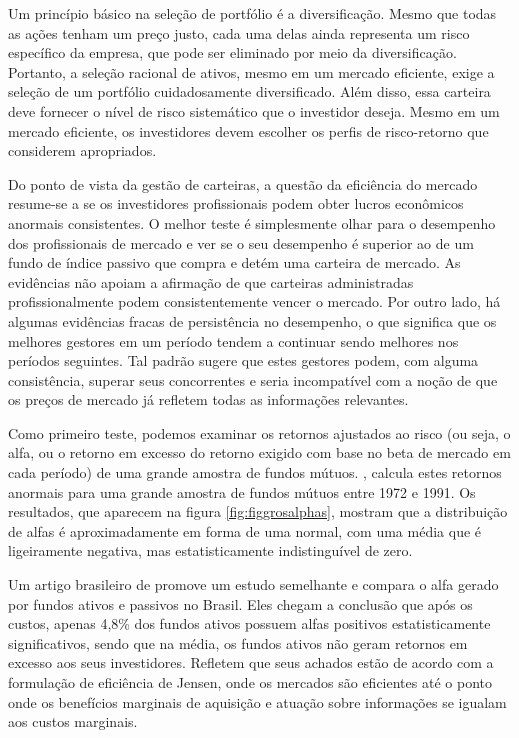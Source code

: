 Um princípio básico na seleção de portfólio é a diversificação. Mesmo que todas as ações tenham um preço justo, cada uma delas ainda representa um risco específico da empresa, que pode ser eliminado por meio da diversificação. Portanto, a seleção racional de ativos, mesmo em um mercado eficiente, exige a seleção de um portfólio cuidadosamente diversificado. Além disso, essa carteira deve fornecer o nível de risco sistemático que o investidor deseja. Mesmo em um mercado eficiente, os investidores devem escolher os perfis de risco-retorno que considerem apropriados.

Do ponto de vista da gestão de carteiras, a questão da eficiência do mercado resume-se a se os investidores profissionais podem obter lucros econômicos anormais consistentes. O melhor teste é simplesmente olhar para o desempenho dos profissionais de mercado e ver se o seu desempenho é superior ao de um fundo de índice passivo que compra e detém uma carteira de mercado. As evidências não apoiam a afirmação de que carteiras administradas profissionalmente podem consistentemente vencer o mercado. Por outro lado, há algumas evidências fracas de persistência no desempenho, o que significa que os melhores gestores em um período tendem a continuar sendo melhores nos períodos seguintes. Tal padrão sugere que estes gestores podem, com alguma consistência, superar seus concorrentes e seria incompatível com a noção de que os preços de mercado já refletem todas as informações relevantes.

Como primeiro teste, podemos examinar os retornos ajustados ao risco (ou seja, o alfa, ou o retorno em excesso do retorno exigido com base no beta de mercado em cada período) de uma grande amostra de fundos mútuos. , calcula estes retornos anormais para uma grande amostra de fundos mútuos entre 1972 e 1991. Os resultados, que aparecem na figura \ref{fig:figgrosalphas}, mostram que a distribuição de alfas é aproximadamente em forma de uma normal, com uma média que é ligeiramente negativa, mas estatisticamente indistinguível de zero. 

Um artigo brasileiro de  promove um estudo semelhante e compara o alfa gerado por fundos ativos e passivos no Brasil. Eles chegam a conclusão que após os custos, apenas 4,8\% dos fundos ativos possuem alfas positivos estatisticamente significativos, sendo que na média, os fundos ativos não geram retornos em excesso aos seus investidores. Refletem que seus achados estão de acordo com a formulação de eficiência de Jensen, onde os mercados são eficientes até o ponto onde os benefícios marginais de aquisição e atuação sobre informações se igualam aos custos marginais.

